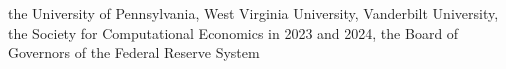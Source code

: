 the University of Pennsylvania, West Virginia University, Vanderbilt University, the Society for Computational Economics in 2023 and 2024, the Board of Governors of the Federal Reserve System%
